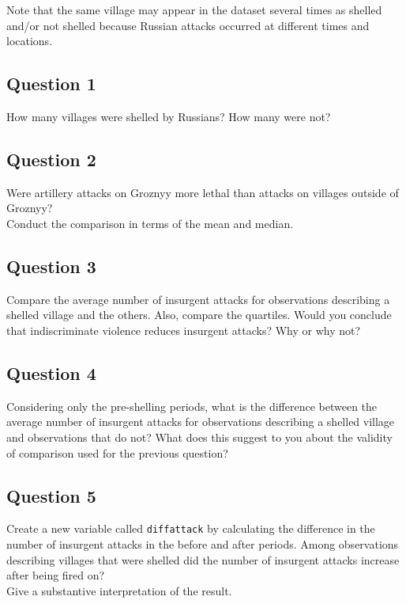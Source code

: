 \documentclass[]{article}
\begin{document}
Note that the same village may appear in the dataset several times as
shelled and/or not shelled because Russian attacks occurred at different
times and locations.

\subsection{Question 1}\label{question-1}

How many villages were shelled by Russians? How many were not?

\subsection{Question 2}\label{question-2}

Were artillery attacks on Groznyy more lethal than attacks on villages
outside of Groznyy?\\ Conduct the comparison in terms of the mean and
median.

\subsection{Question 3}\label{question-3}

Compare the average number of insurgent attacks for observations
describing a shelled village and the others. Also, compare the
quartiles. Would you conclude that indiscriminate violence reduces
insurgent attacks? Why or why not?

\subsection{Question 4}\label{question-4}

Considering only the pre-shelling periods, what is the difference
between the average number of insurgent attacks for observations
describing a shelled village and observations that do not? What does
this suggest to you about the validity of comparison used for the
previous question?

\subsection{Question 5}\label{question-5}

Create a new variable called \texttt{diffattack} by calculating the
difference in the number of insurgent attacks in the before and after
periods. Among observations describing villages that were shelled did
the number of insurgent attacks increase after being fired on?\\ Give a
substantive interpretation of the result.
\end{document}

